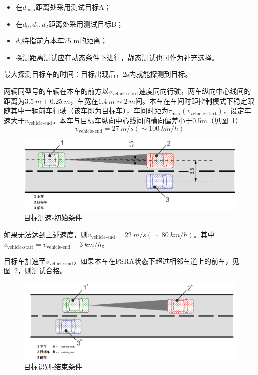 \documentclass[is,copyright,is]{isov2}
\begin{document}
\begin{itemize}
	\item 在$d_\text{max}$距离处采用测试目标A；
	\item 在$d_0,d_1,d_2$距离处采用测试目标B；
	\item $d_2$特指前方本车75 m的距离；
	\item 探测距离测试应在动态条件下进行，静态测试也可作为补充选择。
\end{itemize}
最大探测目标车的时间：目标出现后，2s内就能探测到目标。

\label{7.4}
两辆同型号的车辆在本车的前方以$v_\text{vehicle-start}$速度同向行驶，两车纵向中心线间的距离为$\SI{3.5}{m}\pm \SI{0.25}{m}$，车宽在$\SI{1.4}{m}\sim \SI{2}{m}$间。本车在车间时距控制模式下稳定跟随其中一辆前车行驶（该车即为目标车），车间时距为$\tau_\text{max}(v_\text{vehicle-start})$，设定车速大于$v_\text{vehicle-end}$。本车与目标车纵向中心线间的横向偏差小于0.5m（见图~\ref{fig:startconditions}）
\[v_\text{vehicle-end} = \SI{27}{m/s}(\sim \SI{100}{km/h})\]
\begin{figure}[htbp]
	\centering
	\includegraphics[width=0.7\linewidth]{figures/Startconditions}
	\caption{目标测速-初始条件}
	\label{fig:startconditions}
\end{figure}

\begin{anote}
如果无法达到上述速度，则$v_\text{vehicle-end} = \SI{22}{m/s}(\sim \SI{80}{km/h})$。其中$v_\text{vehicle-start} = v_\text{vehicle-end} -\SI{3}{km/h}$。
\end{anote}
目标车加速至$v_\text{vehicle-end}$，如果本车在FSRA状态下超过相邻车道上的前车，见图~\ref{fig:endcondition}，则测试合格。
\begin{figure}[htbp]
	\centering
	\includegraphics[width=0.7\linewidth]{figures/endtestdis}
	\caption{目标识别-结束条件}
	\label{fig:endcondition}
\end{figure}
\end{document}

